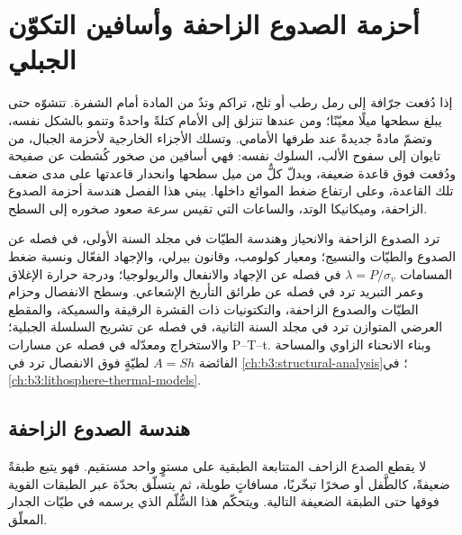 \chapter{أحزمة الصدوع الزاحفة وأسافين التكوّن الجبلي}\label{ch:b3:orogenic-wedges}

إذا دُفعت جرّافة إلى رمل رطب أو ثلج، تراكم وتدٌ من المادة
أمام الشفرة. تتشوّه حتى يبلغ سطحها ميلًا معيّنًا؛
ومن عندها تنزلق إلى الأمام كتلةً واحدةً وتنمو بالشكل نفسه،
وتضمّ مادةً جديدةً عند طرفها الأمامي. وتسلك الأجزاء الخارجية لأحزمة الجبال،
من تايوان إلى سفوح الألب، السلوك نفسه: فهي أسافين من صخور كُشطت عن صفيحة
ودُفعت فوق قاعدة ضعيفة، ويدلّ كلٌّ من ميل سطحها وانحدار قاعدتها
على مدى ضعف تلك القاعدة، وعلى ارتفاع
ضغط الموائع داخلها. يبني هذا الفصل هندسة أحزمة الصدوع الزاحفة،
وميكانيكا الوتد، والساعات التي تقيس سرعة صعود صخوره
إلى السطح.

\begin{recall}
ترد الصدوع الزاحفة والانحياز وهندسة الطيّات في مجلد السنة الأولى، في
فصله عن الصدوع والطيّات والنسيج؛ ومعيار كولومب، وقانون بيرلي، والإجهاد
الفعّال ونسبة ضغط المسامات $\lambda = P/\sigma_v$ في فصله عن
الإجهاد والانفعال والريولوجيا؛ ودرجة حرارة الإغلاق وعمر التبريد
ترد في فصله عن طرائق التأريخ الإشعاعي. وسطح الانفصال وحزام الطيّات
والصدوع الزاحفة، والتكتونيات ذات القشرة الرقيقة والسميكة، والمقطع العرضي
المتوازن ترد في مجلد السنة الثانية، في فصله عن تشريح
السلسلة الجبلية؛ والاستخراج ومعدّله في فصله عن مسارات P--T--t. وبناء
الانحناء الزاوي والمساحة الفائضة $A = Sh$ لطيّةٍ فوق
الانفصال ترد في \cref{ch:b3:structural-analysis}؛  في
\cref{ch:b3:lithosphere-thermal-models}.
\end{recall}

\section{هندسة الصدوع الزاحفة}\label{sec:b3:orogenic-wedges:geometry}

لا يقطع الصدع الزاحف المتتابعة الطبقية على مستوٍ واحد مستقيم.
فهو يتبع طبقةً ضعيفةً، كالطَّفل أو صخرًا تبخّريًا، مسافاتٍ طويلة، ثم
يتسلّق بحدّة عبر الطبقات القوية فوقها حتى الطبقة الضعيفة التالية.
ويتحكّم هذا السُّلّم الذي يرسمه في طيّات الجدار المعلّق.

